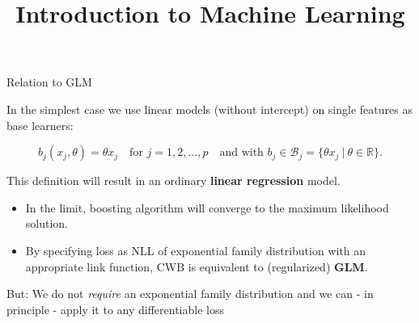 \documentclass[11pt,compress,t,notes=noshow, xcolor=table]{beamer}
\title{Introduction to Machine Learning}\date{}
\begin{document}


\begin{vbframe}{Relation to GLM}

In the simplest case we use linear models (without intercept) on single features
as base learners:

$$
  b_j(x_j,\theta) = \theta x_j  \quad \text{for } j = 1, 2, \dots, p \quad
  \text{and with } b_j \in \mathcal{B}_j = \{\theta x_j  ~\rvert~ \theta \in
  \mathbb{R} \}.
$$


This definition will result in an ordinary \textbf{linear regression} model.

\lz


\begin{itemize} 
\setlength{\itemsep}{1.6em}
  \item In the limit, boosting algorithm will converge to the maximum likelihood solution.
  \item By specifying loss as NLL of exponential family distribution with an appropriate link function, CWB is equivalent to (regularized) \textbf{GLM}.
\end{itemize}

\framebreak


But: We do not \emph{require} an exponential family distribution and we can - in principle - apply it to any differentiable loss %


\end{vbframe}
\end{document}
